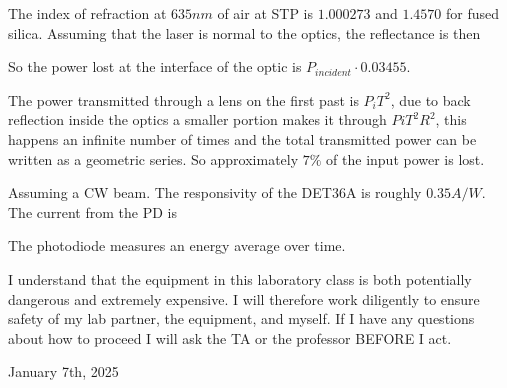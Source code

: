The index of refraction at $635nm$ of air at STP is $1.000273$ and $1.4570$ for fused silica.
Assuming that the laser is normal to the optics, the reflectance is then

So the power lost at the interface of the optic is $P_{incident}\cdot0.03455$.

The power transmitted through a lens on the first past is $P_iT^2$, due to back reflection inside the optics a smaller portion makes it through $PiT^2R^2$, this happens an infinite number of times and the total transmitted power can be written as a geometric series.
So approximately $7\%$ of the input power is lost. 


Assuming a CW beam. The responsivity of the DET36A is roughly $0.35A/W$. The current from the PD is

The photodiode measures an energy average over time. 


I understand that the equipment in this laboratory class is both potentially dangerous and extremely expensive. I will therefore work diligently to ensure safety of my lab partner, the equipment, and myself. If I have any questions about how to proceed I will ask the TA or the professor BEFORE I act.

January 7th, 2025

